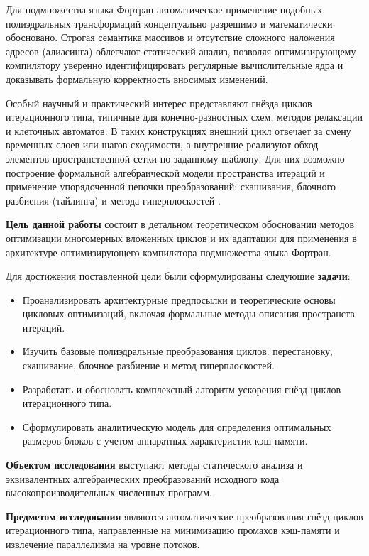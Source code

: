 \documentclass[14pt, russian]{scrartcl}
\begin{document}
Для подмножества языка Фортран автоматическое применение подобных полиэдральных трансформаций концептуально разрешимо и математически обосновано. Строгая семантика массивов и отсутствие сложного наложения адресов (алиасинга) облегчают статический анализ, позволяя оптимизирующему компилятору уверенно идентифицировать регулярные вычислительные ядра и доказывать формальную корректность вносимых изменений.

Особый научный и практический интерес представляют гнёзда циклов итерационного типа, типичные для конечно-разностных схем, методов релаксации и клеточных автоматов. В таких конструкциях внешний цикл отвечает за смену временных слоев или шагов сходимости, а внутренние реализуют обход элементов пространственной сетки по заданному шаблону. Для них возможно построение формальной алгебраической модели пространства итераций и применение упорядоченной цепочки преобразований: скашивания, блочного разбиения (тайлинга) и метода гиперплоскостей \cite{metelica2024}.

\textbf{Цель данной работы} состоит в детальном теоретическом обосновании методов оптимизации многомерных вложенных циклов и их адаптации для применения в архитектуре оптимизирующего компилятора подмножества языка Фортран.

Для достижения поставленной цели были сформулированы следующие \textbf{задачи}:
\begin{itemize}
    \item Проанализировать архитектурные предпосылки и теоретические основы цикловых оптимизаций, включая формальные методы описания пространств итераций.
    \item Изучить базовые полиэдральные преобразования циклов: перестановку, скашивание, блочное разбиение и метод гиперплоскостей.
    \item Разработать и обосновать комплексный алгоритм ускорения гнёзд циклов итерационного типа.
    \item Сформулировать аналитическую модель для определения оптимальных размеров блоков с учетом аппаратных характеристик кэш-памяти.
\end{itemize}

\textbf{Объектом исследования} выступают методы статического анализа и эквивалентных алгебраических преобразований исходного кода высокопроизводительных численных программ.

\textbf{Предметом исследования} являются автоматические преобразования гнёзд циклов итерационного типа, направленные на минимизацию промахов кэш-памяти и извлечение параллелизма на уровне потоков.
\end{document}
